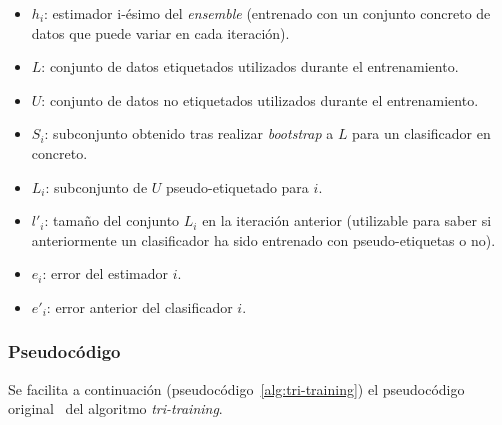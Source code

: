 \begin{itemize}
	\item $h_{i}$: estimador i-ésimo del \textit{ensemble} (entrenado con un conjunto concreto de datos que puede variar en cada iteración).
	\item $L$: conjunto de datos etiquetados utilizados durante el entrenamiento.
	\item $U$: conjunto de datos no etiquetados utilizados durante el entrenamiento.
	\item $S_{i}$: subconjunto obtenido tras realizar \textit{bootstrap} a $L$ para un clasificador en concreto.
	\item $L_{i}$: subconjunto de $U$ pseudo-etiquetado para $i$.
	\item $l'_{i}$: tamaño del conjunto $L_i$ en la iteración anterior (utilizable para saber si anteriormente un clasificador ha sido entrenado con pseudo-etiquetas o no).	
	\item $e_{i}$: error del estimador $i$.	
	\item $e'_{i}$: error anterior del clasificador $i$.	
\end{itemize} 

\subsubsection{Pseudocódigo}
Se facilita a continuación (pseudocódigo~\ref{alg:tri-training}) el pseudocódigo original~\cite{tritraining2005@original} del algoritmo \textit{tri-training}.

